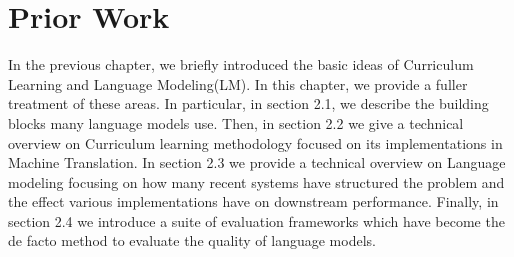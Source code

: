\chapter{Prior Work}
In the previous chapter, we briefly introduced the basic ideas of Curriculum Learning and Language Modeling(LM). In this chapter, we provide a fuller treatment of these areas. In particular, in section 2.1, we describe the building blocks many language models use. Then, in section 2.2 we give a technical overview on Curriculum learning methodology focused on its implementations in Machine Translation. In section 2.3 we provide a technical overview on Language modeling focusing on how many recent systems have structured the problem and the effect various implementations have on downstream performance.  Finally, in section 2.4 we introduce a suite of evaluation frameworks which have become the de facto method to evaluate the quality of language models.



